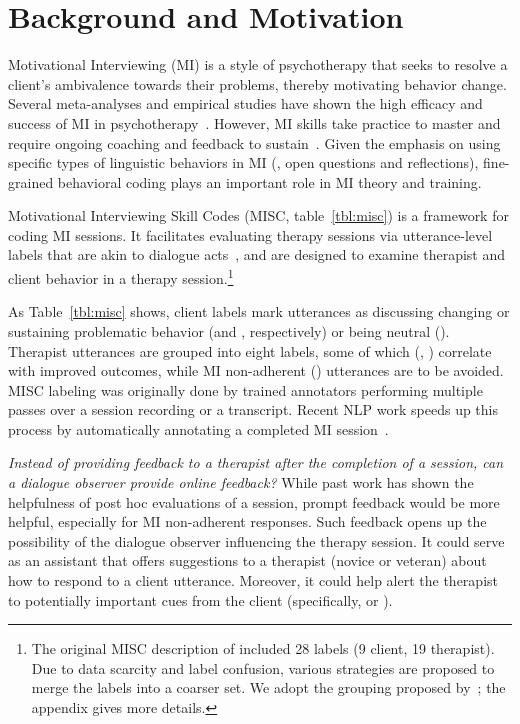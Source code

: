\section{Background and Motivation} \label{sec:background}
Motivational Interviewing (MI) is a style of psychotherapy that
seeks to resolve a client's ambivalence towards their problems,
thereby motivating behavior change. Several meta-analyses and
empirical studies have shown the high efficacy and success of MI in
psychotherapy~\cite{burke2004emerging, martins2009review,
  lundahl2010meta}. However, MI skills take practice to master and
require ongoing coaching and feedback to
sustain~\cite{Schwalbe2014}.  Given the emphasis on using specific
types of linguistic behaviors in MI (\eg,
open questions and reflections), fine-grained behavioral coding
plays an important role in MI theory and training.

Motivational Interviewing Skill Codes (MISC, table~\ref{tbl:misc})
is a framework for coding MI sessions. It facilitates evaluating
therapy sessions via utterance-level labels that are akin to
dialogue acts~\cite{stolcke2000dialogue,jurafsky2018speech}, and are designed to examine therapist and client
behavior in a therapy session.\footnote{The original MISC description of
  \citet{miller2003manual} included 28 labels (9 client, 19
  therapist). Due to data scarcity and label confusion, various
  strategies are proposed to merge the labels into a coarser set.
  We adopt the grouping proposed by~\citet{xiao2016behavioral}; the
  appendix gives more details.}

As Table~\ref{tbl:misc} shows,
client labels mark utterances as discussing changing or sustaining
problematic behavior (\CHANGE and \SUSTAIN, respectively) or being
neutral (\FN). Therapist utterances are grouped into eight labels,
some of which (\RES, \REC) correlate with improved outcomes, while
MI non-adherent (\MIN) utterances are to be avoided.  MISC labeling
was originally done by trained annotators performing multiple passes
over a session recording or a transcript.  Recent NLP work speeds up
this process by automatically annotating a completed MI
session~\cite[\eg,][]{tanana2016comparison, xiao2016behavioral,
  perez2017predicting}.

\emph{Instead of providing feedback to a therapist after the
  completion of a session, can a dialogue observer provide online
  feedback?} While past work has shown the helpfulness of post hoc
evaluations of a session, prompt feedback would be more helpful,
especially for MI non-adherent responses.  Such feedback opens up
the possibility of the dialogue observer influencing the therapy
session. It could serve as an assistant that offers suggestions to a
therapist (novice or veteran) about how to respond to a client
utterance. Moreover, it could help alert the therapist to
potentially important cues from the client (specifically, \CHANGE or
\SUSTAIN).